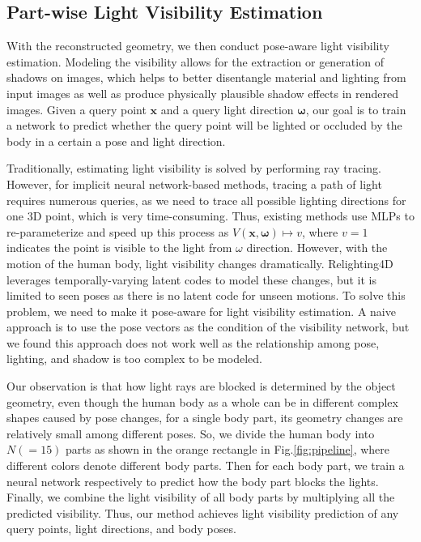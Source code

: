 \subsection{Part-wise Light Visibility Estimation}
\label{sec:vis_est}
With the reconstructed geometry, we then conduct pose-aware light visibility estimation.
Modeling the visibility allows for the extraction or generation of shadows on images, which helps to better disentangle material and lighting from input images as well as produce physically plausible shadow effects in rendered images.
Given a query point $\mathbf{x}$ and a query light direction $\mathbf{\omega}$, our goal is to train a network to predict whether the query point will be lighted or occluded by the body in a certain a pose and light direction.

Traditionally, estimating light visibility is solved by performing ray tracing.
However, for implicit neural network-based methods, tracing a path of light requires numerous queries, as we need to trace all possible lighting directions for one 3D point, which is very time-consuming.
Thus, existing methods \cite{NeRFactor, InvRender, Relighting4D} use MLPs to re-parameterize and speed up this process as $V\left(\mathbf{x}, \mathbf{\omega}\right) \mapsto v$, where $v=1$ indicates the point is visible to the light from $\omega$ direction.
However, with the motion of the human body, light visibility changes dramatically.
Relighting4D \cite{Relighting4D} leverages temporally-varying latent codes to model these changes, but it is limited to seen poses as there is no latent code for unseen motions.
To solve this problem, we need to make it pose-aware for light visibility estimation.
A naive approach is to use the pose vectors as the condition of the visibility network, but we found this approach does not work well as the relationship among pose, lighting, and shadow is too complex to be modeled.

Our observation is that how light rays are blocked is determined by the object geometry, even though the human body as a whole can be in different complex shapes caused by pose changes, for a single body part, its geometry changes are relatively small among different poses.
So, we divide the human body into $N(=15)$ parts as shown in the orange rectangle in Fig.\ref{fig:pipeline}, where different colors denote different body parts.
Then for each body part, we train a neural network respectively to predict how the body part blocks the lights.
Finally, we combine the light visibility of all body parts by multiplying all the predicted visibility.
Thus, our method achieves light visibility prediction of any query points, light directions, and body poses.

